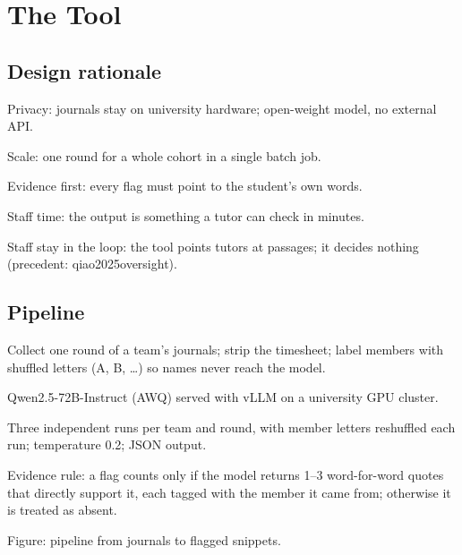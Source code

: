 \section{The Tool}
\label{sec:tool}

\subsection{Design rationale}
\begin{outline}
  \item Privacy: journals stay on university hardware; open-weight model, no external API.
  \item Scale: one round for a whole cohort in a single batch job.
  \item Evidence first: every flag must point to the student's own words.
  \item Staff time: the output is something a tutor can check in minutes.
  \item Staff stay in the loop: the tool points tutors at passages; it decides nothing
    (precedent: qiao2025oversight).
\end{outline}

\subsection{Pipeline}
\begin{outline}
  \item Collect one round of a team's journals; strip the timesheet; label members with
    shuffled letters (A, B, \ldots) so names never reach the model.
  \item Qwen2.5-72B-Instruct (AWQ) served with vLLM on a university GPU cluster.
  \item Three independent runs per team and round, with member letters reshuffled each
    run; temperature 0.2; JSON output.
  \item Evidence rule: a flag counts only if the model returns 1--3 word-for-word quotes
    that directly support it, each tagged with the member it came from; otherwise it is
    treated as absent.
  \item Figure: pipeline from journals to flagged snippets.
\end{outline}

